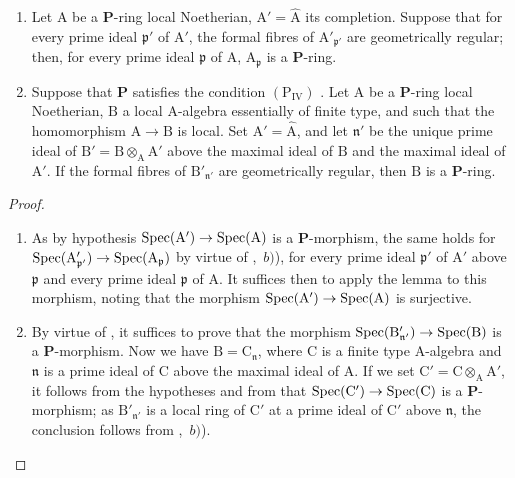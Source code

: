 \begin{corollary}[7.4.3]
\label{IV.7.4.3}
\begin{enumerate}[label=\emph{\roman*)}]
  \item Let $\mathrm{A}$ be a $\boldsymbol{P}$-ring local Noetherian, $\mathrm{A}'=\widehat{\mathrm{A}}$ its completion.
  Suppose that for every prime ideal $\mathfrak{p}'$ of $\mathrm{A}'$, the formal fibres of $\mathrm{A}'_{\mathfrak{p}'}$ are geometrically regular; then, for every prime ideal $\mathfrak{p}$ of $\mathrm{A}$, $\mathrm{A}_\mathfrak{p}$ is a $\boldsymbol{P}$-ring.

  \item Suppose that $\boldsymbol{P}$ satisfies the condition $(\mathrm{P_{IV}})$ .
  Let $\mathrm{A}$ be a $\boldsymbol{P}$-ring local Noetherian, $\mathrm{B}$ a local A-algebra essentially of finite type, and such that the homomorphism $\mathrm{A}\to\mathrm{B}$ is local.
  Set $\mathrm{A}'=\widehat{\mathrm{A}}$, and let $\mathfrak{n}'$ be the unique prime ideal of $\mathrm{B}'=\mathrm{B}\otimes_\mathrm{A}\mathrm{A}'$ above the maximal ideal of $\mathrm{B}$ and the maximal ideal of $\mathrm{A}'$.
  If the formal fibres of $\mathrm{B}'_{\mathfrak{n}'}$ are geometrically regular, then $\mathrm{B}$ is a $\boldsymbol{P}$-ring.
\end{enumerate}
\end{corollary}

\begin{proof}
\begin{enumerate}[label=(\roman*)]
  \item As by hypothesis $\operatorname{Spec}(\mathrm{A}')\to\operatorname{Spec}(\mathrm{A})$ is a $\boldsymbol{P}$-morphism, the same holds for $\operatorname{Spec}(\mathrm{A}'_{\mathfrak{p}'})\to\operatorname{Spec}(\mathrm{A}_\mathfrak{p})$ by virtue of ,~$b)$), for every prime ideal $\mathfrak{p}'$ of $\mathrm{A}'$ above $\mathfrak{p}$ and every prime ideal $\mathfrak{p}$ of $\mathrm{A}$.
  It suffices then to apply the lemma  to this morphism, noting that the morphism $\operatorname{Spec}(\mathrm{A}')\to\operatorname{Spec}(\mathrm{A})$ is surjective.

  \item By virtue of , it suffices to prove that the morphism $\operatorname{Spec}(\mathrm{B}'_{\mathfrak{n}'})\to\operatorname{Spec}(\mathrm{B})$ is a $\boldsymbol{P}$-morphism.
  Now we have $\mathrm{B}=\mathrm{C}_\mathfrak{n}$, where $\mathrm{C}$ is a finite type A-algebra and $\mathfrak{n}$ is a prime ideal of $\mathrm{C}$ above the maximal ideal of $\mathrm{A}$.
  If we set $\mathrm{C}'=\mathrm{C}\otimes_\mathrm{A}\mathrm{A}'$, it follows from the hypotheses and from  that $\operatorname{Spec}(\mathrm{C}')\to\operatorname{Spec}(\mathrm{C})$ is a $\boldsymbol{P}$-morphism; as $\mathrm{B}'_{\mathfrak{n}'}$ is a local ring of $\mathrm{C}'$ at a prime ideal of $\mathrm{C}'$ above $\mathfrak{n}$, the conclusion follows from ,~$b)$).
\end{enumerate}
\end{proof}

